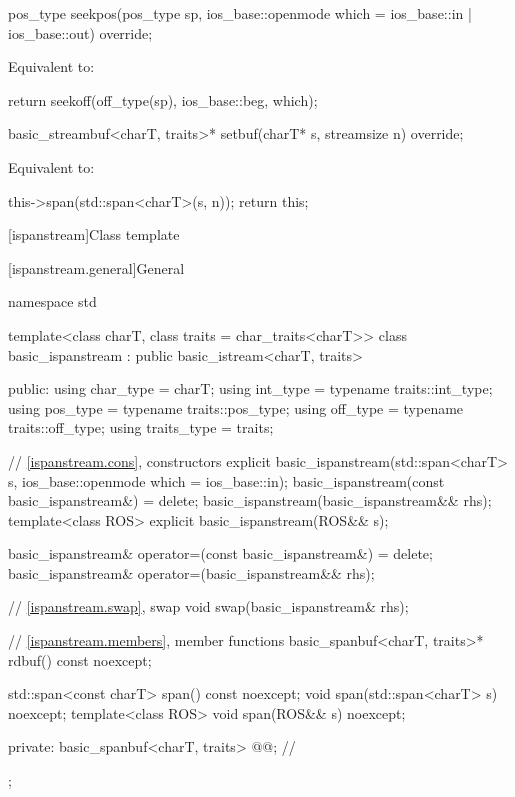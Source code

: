 %
\begin{itemdecl}
pos_type seekpos(pos_type sp, ios_base::openmode which = ios_base::in | ios_base::out) override;
\end{itemdecl}

\begin{itemdescr}
\pnum
\effects
Equivalent to:
\begin{codeblock}
return seekoff(off_type(sp), ios_base::beg, which);
\end{codeblock}
\end{itemdescr}

%
\begin{itemdecl}
basic_streambuf<charT, traits>* setbuf(charT* s, streamsize n) override;
\end{itemdecl}

\begin{itemdescr}
\pnum
\effects
Equivalent to:
\begin{codeblock}
this->span(std::span<charT>(s, n));
return this;
\end{codeblock}
\end{itemdescr}

[ispanstream]{Class template }

[ispanstream.general]{General}

%
\begin{codeblock}
namespace std {
  template<class charT, class traits = char_traits<charT>>
  class basic_ispanstream
    : public basic_istream<charT, traits> {
  public:
    using char_type   = charT;
    using int_type    = typename traits::int_type;
    using pos_type    = typename traits::pos_type;
    using off_type    = typename traits::off_type;
    using traits_type = traits;

    // \ref{ispanstream.cons}, constructors
    explicit basic_ispanstream(std::span<charT> s,
                               ios_base::openmode which = ios_base::in);
    basic_ispanstream(const basic_ispanstream&) = delete;
    basic_ispanstream(basic_ispanstream&& rhs);
    template<class ROS> explicit basic_ispanstream(ROS&& s);

    basic_ispanstream& operator=(const basic_ispanstream&) = delete;
    basic_ispanstream& operator=(basic_ispanstream&& rhs);

    // \ref{ispanstream.swap}, swap
    void swap(basic_ispanstream& rhs);

    // \ref{ispanstream.members}, member functions
    basic_spanbuf<charT, traits>* rdbuf() const noexcept;

    std::span<const charT> span() const noexcept;
    void span(std::span<charT> s) noexcept;
    template<class ROS> void span(ROS&& s) noexcept;

  private:
    basic_spanbuf<charT, traits> @@;    // \expos
  };
}
\end{codeblock}

